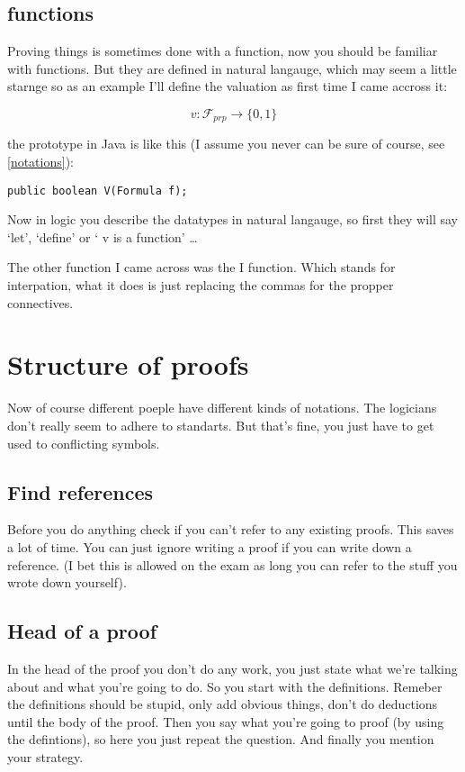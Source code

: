 \documentclass{article}
\begin{document}
\subsection{functions}
Proving things is sometimes done with a function,
now you should be familiar with functions.
But they are defined in natural langauge, which may seem a little starnge
so as an example I'll define the valuation as first time I came accross it:

\[v:\mathcal{F}_{prp} \to \{0,1\}\]

the prototype in Java is like this (I assume you never can be sure of course,
see \autoref{notations}):


\begin{lstlisting}[frame=single] 
	public boolean V(Formula f);
\end{lstlisting}

Now in logic you describe the datatypes in natural langauge, so first they will
say `let', `define' or ` v is a function' \ldots

The other function I came across was the I function. Which stands for 
interpation, what it does is just replacing the commas for the propper
connectives.

\section{Structure of proofs}
\label{structure of proofs}
Now of course different poeple have different kinds of notations. The logicians
don't really seem to adhere to standarts. But that's fine, you just have to
get used to conflicting symbols.

\subsection{Find references}
Before you do anything check if you can't refer to any existing proofs.
This saves a lot of time. You can just ignore writing a proof if you can
write down a reference. (I bet this is allowed on the exam as long you
can refer to the stuff you wrote down yourself).

\subsection{Head of a proof}
In the head of the proof you don't do any work, you just state what we're
talking about and what you're going to do. So you start with the definitions.
Remeber the definitions should be stupid, only add obvious things, don't do
deductions until the body of the proof.
Then you say what you're going to proof (by using the defintions), so here
you just repeat the question. And finally you mention your strategy.
\end{document}
